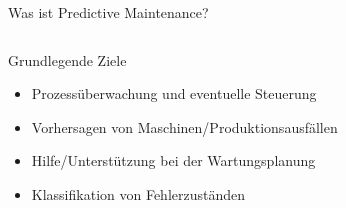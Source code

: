 \documentclass[aspectratio=1610, xcolor=dvipsnames, 9pt]{beamer}
\begin{document}
\begin{frame}{Was ist Predictive Maintenance?}
  \begin{columns}
    \begin{column}{1\textwidth}
      Grundlegende Ziele
      \begin{itemize}
        \item Prozessüberwachung und eventuelle Steuerung \newline
        \item Vorhersagen von Maschinen/Produktionsausfällen \newline
        \item Hilfe/Unterstützung bei der Wartungsplanung \newline
        \item Klassifikation von Fehlerzuständen \newline
      \end{itemize}
    \end{column}
  \end{columns}
    \end{frame}
\end{document}

